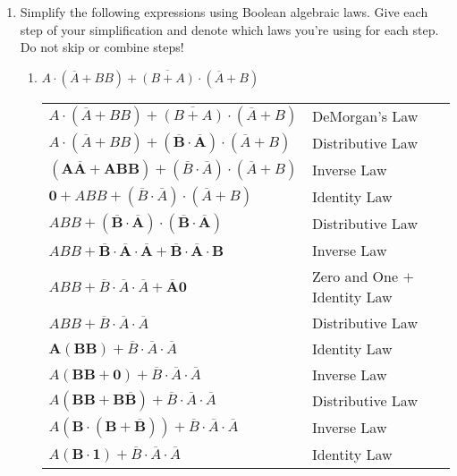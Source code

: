 \documentclass{article}
\begin{document}
    \begin{enumerate}
        \item Simplify the following expressions using Boolean algebraic laws. Give each step of your simplification and denote which laws you’re using for each step. Do not skip or combine steps!
        \begin{enumerate}
            \item $A \cdot (\overline{A} + BB) + \overline{(B+A)} \cdot (\overline{A} + B)$\\[0.25in]
            \begin{tabular}{l l}
                $A \cdot (\overline{A} + BB) + \overline{(B+A)} \cdot (\overline{A} + B)$ & DeMorgan's Law\\
                $A \cdot (\overline{A}+BB) + \mathbf{(\overline{B} \cdot \overline{A})} \cdot (\overline{A} + B)$ & Distributive Law\\
                $\mathbf{(A\overline{A} + ABB)} + (\overline{B} \cdot \overline{A}) \cdot (\overline{A} + B)$ & Inverse Law\\
                $\mathbf{0} + ABB + (\overline{B} \cdot \overline{A}) \cdot (\overline{A} + B)$ & Identity Law\\
                $ABB + \mathbf{(\overline{B} \cdot \overline{A}) \cdot (\overline{B} \cdot \overline{A})}$ & Distributive Law\\
                $ABB + \mathbf{\overline{B} \cdot \overline{A} \cdot \overline{A} + \overline{B} \cdot \overline{A} \cdot B}$ & Inverse Law\\
                $ABB + \overline{B} \cdot \overline{A} \cdot \overline{A} + \mathbf{\overline{A}0}$ & Zero and One $+$ Identity Law\\
                $ABB + \overline{B} \cdot \overline{A} \cdot \overline{A}$ & Distributive Law \\
                $\mathbf{A(BB)} + \overline{B} \cdot \overline{A} \cdot \overline{A}$ & Identity Law\\
                $A(\mathbf{BB+0}) + \overline{B} \cdot \overline{A} \cdot \overline{A}$ & Inverse Law\\
                $A(\mathbf{BB+B\overline{B}}) + \overline{B} \cdot \overline{A} \cdot \overline{A}$ & Distributive Law\\
                $A(\mathbf{B \cdot (B+\overline{B})}) + \overline{B} \cdot \overline{A} \cdot \overline{A}$ & Inverse Law\\
                $A(\mathbf{B \cdot 1}) + \overline{B} \cdot \overline{A} \cdot \overline{A}$ & Identity Law\\

\end{tabular}
\end{enumerate}
\end{enumerate}
\end{document}
